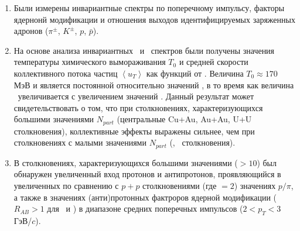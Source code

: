 \begin{enumerate}
\item Были измерены инвариантные спектры по поперечному импульсу, факторы ядернонй модификации и отношения выходов идентифицируемых заряженных адронов ($\pi^\pm$, $K^\pm$, $p$, $\bar{p}$).

\item На основе анализа инвариантных \pt \ и \mt \ спектров были получены значения температуры химического вымораживания $T_{0}$ и средней скорости коллективного потока частиц $\left< u_T \right>$ как функций от \Npart.
Величина $T_{0}\approx170$ МэВ и является постоянной относительно значений \Npart, в то время как величина \ut \ увеличивается с увеличением значений \Npart. Данный результат может свидетельствовать о том, что при столкновениях, характеризующихся большими значениями $N_{part}$ (центральные Cu+Au, Au+Au, U+U столкновения), коллективные эффекты выражены сильнее, чем при столкновениях с малыми значениями $N_{part}$ (\pal, \heau \ столкновения).

\item В столкновениях, характеризующихся большими значениями \Npart (\Npart$>10$) был обнаружен увеличенный вход протонов и антипротонов, проявляющийся в увеличенных по сравнению с $p+p$ столкновениями (где \Npart$=2$) значениях $p/\pi$, а также в значениях (анти)протонных фактроров ядерной модификации ($R_{AB}>1$ для \prot \ и \aprot) в диапазоне средних поперечных импульсов ($2<p_T<3$ ГэВ/$c$).
\begin{comment}
В столкновениях с малыми значениями \Npart (\pal, \heau, \dau столкновениях и периферийных столкновениях Cu+Au, U+U) отношения \prot/$\pi$ близки к значениям, измеренным в \pp-столкновениях ($(p/\pi)^{р+р}$). В столкновениях с большими \Npart (центральные столкновения Cu+Au, Au+Au и U+U) отношения \prot/$\pi$ достигают значения 0.8, что в 2,5 раза больше, чем $(p/\pi)^{ р+р}$. Таким образом, в столкновениях тяжелых ионов (\cuau, \auau, \uu) отношения \prot/$\pi$ сильно зависят от центральности, а при малых \heau и \dau столкновениях зависимость от центральности незначительна в пределах неопределенности. В \pal-столкновениях зависимость от центральности отсутствует и значения \prot/$\pi$ согласуются с таковыми, измеренными в \pp-столкновениях, в пределах погрешностей.
Отношения $K/\pi$ во всех рассмотренных системах также не показывают зависимости от центральности.
Наблюдаемое поведение отношений $p/\pi$ и $K/\pi$ можно описать в рамках рекомбинационных моделей адронизации КГП.
\end{comment}


\end{enumerate}
